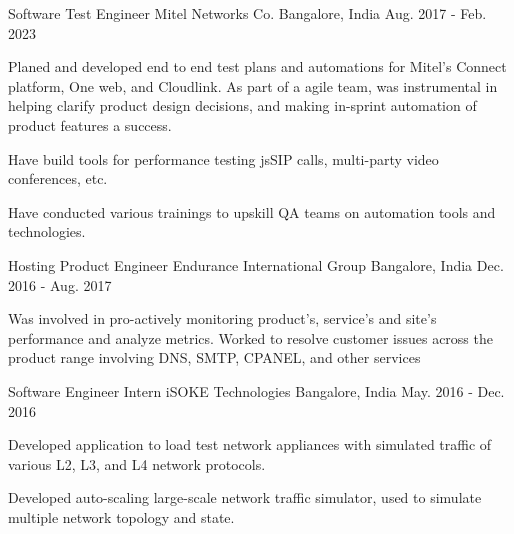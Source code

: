 

\begin{cventries}

  \cventry
    {Software Test Engineer} %
    {Mitel Networks Co.} %
    {Bangalore, India} %
    {Aug. 2017 - Feb. 2023} %
    {
      \begin{cvitems} %
        \item { Planed and developed end to end test plans and automations for Mitel's Connect platform, One web, and Cloudlink. As part of a agile team, was instrumental in helping clarify product design decisions, and making in-sprint automation of product features a success. }
        \item { Have build tools for performance testing jsSIP calls, multi-party video conferences, etc. } 
        \item { Have conducted various trainings to upskill QA teams on automation tools and technologies. }     
      \end{cvitems}
    }

  \cventry
    {Hosting Product Engineer} %
    {Endurance International Group} %
    {Bangalore, India} %
    {Dec. 2016 - Aug. 2017} %
    {
      \begin{cvitems} %
        \item {Was involved in pro-actively monitoring product's, service's and site's performance and analyze metrics. Worked to resolve customer issues across the product range involving DNS, SMTP, CPANEL, and other services}
      \end{cvitems}
    }

  \cventry
    {Software Engineer Intern} %
    {iSOKE Technologies } %
    {Bangalore, India} %
    {May. 2016 - Dec. 2016} %
    {
      \begin{cvitems} %
        \item {Developed application to load test network appliances with simulated traffic of various L2, L3, and L4 network protocols.}
        \item {Developed auto-scaling large-scale network traffic simulator, used to simulate multiple network topology and state.}
      \end{cvitems}
    }
\end{cventries}

